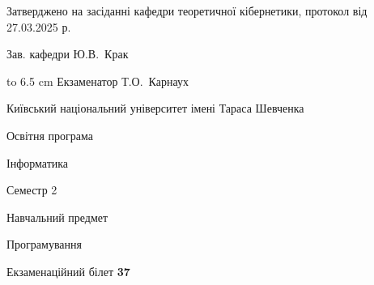 \documentclass[12pt, ukrainian]{article}
\begin{document}
{\smallskip\smallskip \begin {scriptsize} Затверджено на засіданні кафедри теоретичної кібернетики, протокол   від   27.03.2025 р.\par\smallskip\smallskip\smallskip\smallskip
{\parbox {6.5 cm} {Зав. кафедри \dotfill Ю.В.~Крак}}\hspace {0.7cm} {\hbox to 6.5 cm { Екзаменатор \dotfill Т.О.~Карнаух}} \end{scriptsize}}
\newpage
{{\begin {scriptsize}\par
{ \center  Київський національний університет імені Тараса Шевченка \par}
{\parbox {5 cm}{Освітня програма \hfill}{\parbox {7 cm}{Інформатика\hfill}}\parbox {6 cm}{\hfill Семестр 2}}\par
{\parbox {5 cm} {Навчальний предмет \hfill}\parbox {7 cm}{Програмування \hfill}\parbox {6cm}{\hfill}\par}\vspace{-15pt} \end{scriptsize}}{\center Екзаменаційний білет \No \textbf { 37 }\par}}
\end{document}
